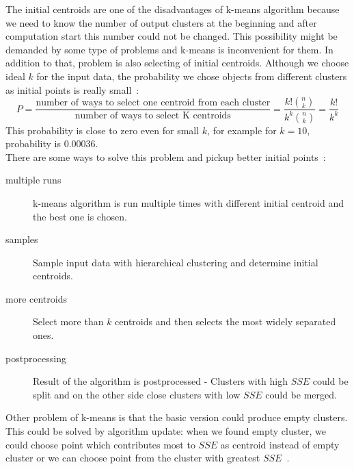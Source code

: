The initial centroids are one of the disadvantages of k-means algorithm because we need to know the number of output clusters at the beginning and after computation start this number could not be changed. This possibility might be demanded by some type of problems and k-means is inconvenient for them. In addition to that, problem is also selecting of initial centroids. Although we choose ideal $k$ for the input data, the probability we chose objects from different clusters as initial points is really small~\cite{Tan05}: $$P = \frac{\mbox{number of ways to select one centroid from each cluster}}{\mbox{number of ways to select K centroids}}=\frac{k!{n \choose k}}{k^k {n \choose k} }=\frac{k!}{k^k}$$ This probability is close to zero even for small $k$, for example for $k=10$, probability is $0.00036$.\\
There are some ways to solve this problem and pickup better initial points~\cite{Tan05}:
\begin{description}
\item[multiple runs] k-means algorithm is run multiple times with different initial centroid and the best one is chosen.
\item[samples] Sample input data with hierarchical clustering and determine initial centroids.
\item[more centroids] Select more than $k$ centroids and then selects the most widely separated ones.
\item[postprocessing] Result of the algorithm is postprocessed - Clusters with high $SSE$ could be split and on the other side close clusters with low $SSE$ could be merged.
\end{description} 

Other problem of k-means is that the basic version could produce empty clusters. This could be solved by algorithm update: when we found empty cluster, we could choose point which contributes most to $SSE$ as centroid instead of empty cluster or we can choose point from the cluster with greatest $SSE$~\cite{Tan05}.

